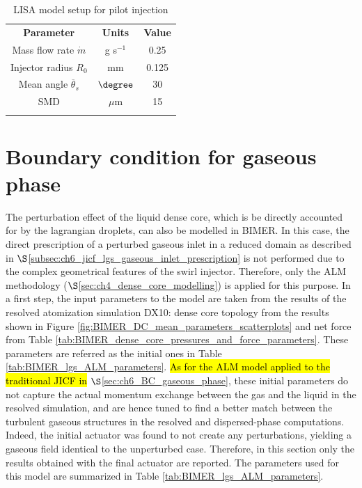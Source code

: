 

\begin{table}[!h]
\centering
\caption{LISA model setup for pilot injection}
\begin{tabular}{ccc}
\thickhline
\textbf{Parameter} & \textbf{Units} &  \textbf{Value} \\
\thickhline
Mass flow rate $\dot{m}$ & g s$^{-1}$ & 0.25 \\
Injector radius $R_0$ & mm & 0.125 \\
Mean angle $\overline{\theta}_s$ & $\degree$ & 30  \\
SMD & $\mu$m & 15 \\
\thickhline
\end{tabular}
\label{tab:LISA_model_parameters}
\end{table}




\section{Boundary condition for gaseous phase}
\label{sec:ch9_BIMER_BCs_for_gaseous_phase}

The perturbation effect of the liquid dense core, which is be directly accounted for by the lagrangian droplets, can also be modelled in BIMER. In this case, the direct prescription of a perturbed gaseous inlet in a reduced domain as described in $\S$\ref{subsec:ch6_jicf_lgs_gaseous_inlet_prescription} is not performed due to the complex geometrical features of the swirl injector. Therefore, only the ALM methodology ($\S$\ref{sec:ch4_dense_core_modelling}) is applied for this purpose. In a first step, the input parameters to the model are taken from the results of the resolved atomization simulation DX10: dense core topology from the results shown in Figure \ref{fig:BIMER_DC_mean_parameters_scatterplots} and net force from Table \ref{tab:BIMER_dense_core_pressures_and_force_parameters}.  These parameters are referred as the initial ones in Table \ref{tab:BIMER_lgs_ALM_parameters}. \hl{As for the ALM model applied to the traditional JICF in} $\S$\ref{sec:ch6_BC_gaseous_phase}, these initial parameters do not capture the actual momentum exchange between the gas and the liquid in the resolved simulation, and are hence tuned to find a better match between the turbulent gaseous structures in the resolved and dispersed-phase computations. Indeed, the initial actuator was found to not create any perturbations, yielding a gaseous field identical to the unperturbed case. Therefore, in this section only the results obtained with the final actuator are reported. The parameters used for this model are summarized in Table \ref{tab:BIMER_lgs_ALM_parameters}. 

